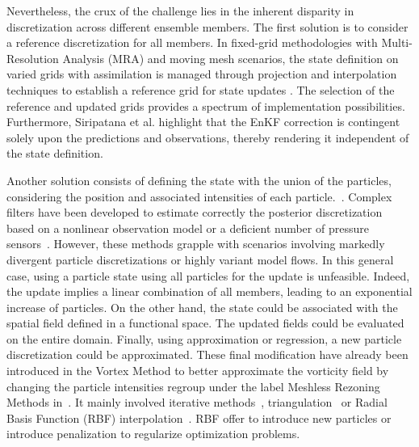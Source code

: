 Nevertheless, the crux of the challenge lies in the inherent disparity in discretization across different ensemble members. The first solution is to consider a reference discretization for all members. In fixed-grid methodologies with Multi-Resolution Analysis (MRA) and moving mesh scenarios, the state definition on varied grids with assimilation is managed through projection and interpolation techniques to establish a reference grid for state updates \cite{siripatana_combining_2019,bonan_data_2017}. The selection of the reference and updated grids provides a spectrum of implementation possibilities. Furthermore, Siripatana et al. \cite{siripatana_combining_2019} highlight that the EnKF correction is contingent solely upon the predictions and observations, thereby rendering it independent of the state definition.

Another solution consists of defining the state with the union of the particles, considering the position and associated intensities of each particle.~\cite{darakananda_data-assimilated_2018}. Complex filters have been developed to estimate correctly the posterior discretization based on a nonlinear observation model or a deficient number of pressure sensors~\cite{le_provost_low-rank_2021}.
However, these methods grapple with scenarios involving markedly divergent particle discretizations or highly variant model flows. In this general case, using a particle state using all particles for the update is unfeasible. Indeed, the update implies a linear combination of all members, leading to an exponential increase of particles.
On the other hand, the state could be associated with the spatial field defined in a functional space. The updated fields could be evaluated on the entire domain. Finally, using approximation or regression, a new particle discretization could be approximated. These final modification have already been introduced in the Vortex Method to better approximate the vorticity field by changing the particle intensities regroup under the label Meshless Rezoning Methods in~\cite{mimeau_review_2021}. It mainly involved iterative methods~\cite{beale_accuracy_1988},  triangulation~\cite{russo_1994} or Radial Basis Function (RBF) interpolation~\cite{barba_lorena_a_vortex_2004,sperotto_2021}. RBF offer to introduce new particles or introduce penalization to regularize optimization problems.\newline

